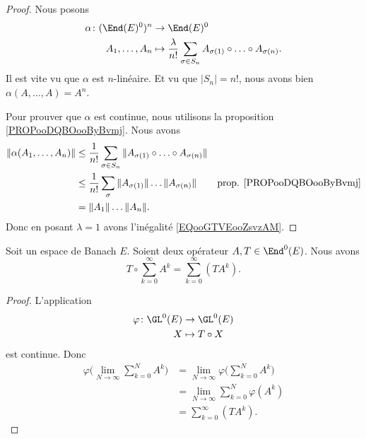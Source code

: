 \begin{proof}
	Nous posons
	\begin{equation}
		\begin{aligned}
			\alpha\colon (\End(E)^0)^n & \to \End(E)^0                                                                               \\
			A_1,\ldots,A_n             & \mapsto \frac{\lambda}{ n!}\sum_{\sigma\in S_n}A_{\sigma(1)}\circ\ldots\circ A_{\sigma(n)}.
		\end{aligned}
	\end{equation}
	Il est vite vu que \( \alpha\) est \( n\)-linéaire. Et vu que \( | S_n |=n!\), nous avons bien \( \alpha(A,\ldots,A)=A^n\).

	Pour prouver que \( \alpha\) est continue, nous utilisons la proposition \ref{PROPooDQBOooByBvmj}. Nous avons
	\begin{subequations}
		\begin{align}
			\| \alpha(A_1,\ldots,A_n) \| & \leq\frac{1}{ n!}\sum_{\sigma\in S_n}\| A_{\sigma(1)}\circ\ldots\circ A_{\sigma(n)} \|                                         \\
			                             & \leq \frac{1}{ n!}\sum_{\sigma}\| A_{\sigma(1)} \|\ldots \| A_{\sigma(n)} \|           & \text{prop. \ref{PROPooDQBOooByBvmj}} \\
			                             & =\| A_1 \|\ldots\| A_n \|.
		\end{align}
	\end{subequations}
	Donc en posant \( \lambda=1\) avons l'inégalité \eqref{EQooGTVEooZsvzAM}.
\end{proof}


\begin{proposition}	\label{PROPooKZNWooLdjDTP}
	Soit un espace de Banach \( E\). Soient deux opérateur \( A,T\in\End^0(E)\). Nous avons
	\begin{equation}
		T\circ\sum_{k=0}^{\infty}A^k=\sum_{k=0}^{\infty}(TA^k).
	\end{equation}
\end{proposition}

\begin{proof}
	L'application
	\begin{equation}
		\begin{aligned}
			\varphi\colon \GL^0(E) & \to \GL^0(E)     \\
			X                      & \mapsto T\circ X
		\end{aligned}
	\end{equation}
	est continue. Donc
	\begin{subequations}
		\begin{align}
			\varphi\Big( \lim_{N\to \infty}\sum_{k=0}^{N}A^k \Big) & =\lim_{N\to \infty}\varphi\Big( \sum_{k=0}^NA^k \Big) \\
			                                                       & =\lim_{N\to \infty}\sum_{k=0}^N\varphi(A^k)           \\
			                                                       & =\sum_{k=0}^{\infty}(TA^k).
		\end{align}
	\end{subequations}
\end{proof}

